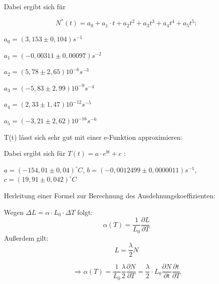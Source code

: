 Dabei ergibt sich für 


\begin{equation}
N^{*}(t)=a_{0}+a_{1} \cdot t+a_{2}t^{2}+a_{3}t^{3}+a_{4}t^{4}+a_{5}t^{5} :
\end{equation}

$
 a_{0} =(3,153 \pm 0,104) s^{-1} 
$

$
a_{1}=(-0,00311 \pm 0,00097)s^{-2}
$

$
a_{2}=(5,78 \pm 2,65)10^{-6}s^{-3}
$

$
a_{3}=(-5,83 \pm 2,99)10^{-9}s^{-4}
$

$
a_{4}=(2,33 \pm 1,47)10^{-12}s^{-5}
$

$
a_{5}=(-3,21 \pm 2,62)10^{-16}s^{-6} 
$

T(t) lässt sich sehr gut mit einer e-Funktion approximieren:

Dabei ergibt sich für $ T(t) = a \cdot e^{bt} + c $ :

$a = (-154,01 \pm 0,04)^{\circ}C$,
$b=(-0,0012499 \pm 0,0000011)s^{-1}$,
$c=(19,91 \pm 0,042)^{\circ}C$

Herleitung einer Formel zur Berechnung des Ausdehnungskoeffizienten:

Wegen $ \Delta L = \alpha \cdot L_{0} \cdot \Delta T $ folgt: 
\\
\begin{equation}
\alpha (T) = \frac{1}{L_{0}} \frac{\partial L}{\partial T}
\end{equation}
Außerdem gilt: 
\begin{equation}
L = \frac{\lambda}{2} N
\end{equation}

\begin{equation}
\Rightarrow \alpha(T) = \frac{1}{L_{0}} \frac{\lambda}{2} \frac{\partial N}{\partial T} = \frac{\lambda}{2} \cdot L_{0} \frac{\partial N}{\partial t} \frac{\partial t}{\partial T}
\end{equation}

